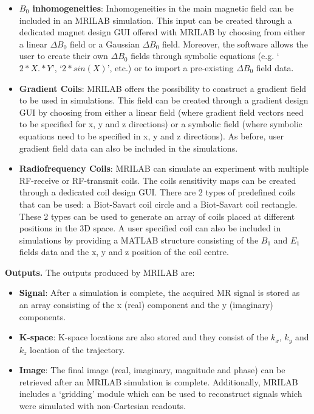 \begin{itemize}
    \item \textbf{$B_0$ inhomogeneities}: Inhomogeneities in the main magnetic field can be included in an MRILAB simulation.
    This input can be created through a dedicated magnet design GUI offered with MRILAB by choosing from either a linear $\Delta B_0$ field or a Gaussian $\Delta B_0$ field.
    Moreover, the software allows the user to create their own $\Delta B_0$ fields through symbolic equations (e.g. `$2*X.*Y$', `$2*sin(X)$', etc.) or to import a pre-existing $\Delta B_0$ field data.
    
    \item \textbf{Gradient Coils}: MRILAB offers the possibility to construct a gradient field to be used in simulations.
    This field can be created through a gradient design GUI by choosing from either a linear field (where gradient field vectors need to be specified for x, y and z directions) or a symbolic field (where symbolic equations need to be specified in x, y and z directions).
    As before, user gradient field data can also be included in the simulations.
    
    \item \textbf{Radiofrequency Coils}: MRILAB can simulate an experiment with multiple RF-receive or RF-transmit coils.
    The coils sensitivity maps can be created through a dedicated coil design GUI.
    There are 2 types of predefined coils that can be used: a Biot-Savart coil circle and a Biot-Savart coil rectangle.
    These 2 types can be used to generate an array of coils placed at different positions in the 3D space.
    A user specified coil can also be included in simulations by providing a MATLAB structure consisting of the $B_1$ and $E_1$ fields data and the x, y and z position of the coil centre.
    
\end{itemize}

\hfill

\textbf{Outputs.} The outputs produced by MRILAB are:
\begin{itemize}
    
    \item \textbf{Signal}: After a simulation is complete, the acquired MR signal is stored as an array consisting of the x (real) component and the y (imaginary) components.
    
    \item \textbf{K-space}: K-space locations are also stored and they consist of the $k_x$, $k_y$ and $k_z$ location of the trajectory.
    
    \item \textbf{Image}: The final image (real, imaginary, magnitude and phase) can be retrieved after an MRILAB simulation is complete.
    Additionally, MRILAB includes a `gridding' module which can be used to reconstruct signals which were simulated with non-Cartesian readouts.
    
\end{itemize}

